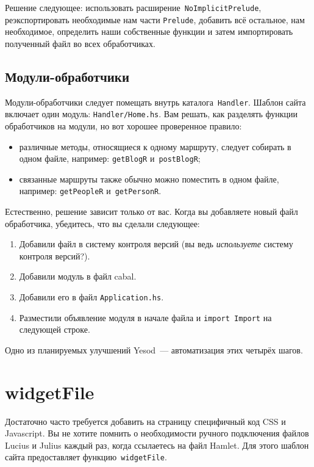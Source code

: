 Решение следующее: использовать расширение~\lstinline!NoImplicitPrelude!,
реэкспортировать необходимые нам части \lstinline!Prelude!, добавить всё
остальное, нам необходимое, определить наши собственные функции и затем
импортировать полученный файл во всех обработчиках.

\subsection{Модули-обработчики}
Модули-обработчики следует помещать внутрь каталога~\lstinline!Handler!. Шаблон
сайта включает один модуль: \texttt{Handler/Home.hs}. Вам решать, как разделять
функции обработчиков на модули, но вот хорошее проверенное правило:
\begin{itemize}
  \item различные методы, относящиеся к одному маршруту, следует собирать в
      одном файле, например: \lstinline!getBlogR! и~\lstinline!postBlogR!;
  \item связанные маршруты также обычно можно поместить в одном файле, например:
      \lstinline!getPeopleR! и~\lstinline!getPersonR!.
\end{itemize}

Естественно, решение зависит только от вас. Когда вы добавляете новый файл
обработчика, убедитесь, что вы сделали следующее:
\begin{enumerate}
  \item Добавили файл в систему контроля версий (вы ведь \emph{используете}
      систему контроля версий?).
  \item Добавили модуль в файл cabal.
  \item Добавили его в файл \texttt{Application.hs}.
  \item Разместили объявление модуля в начале файла и \lstinline!import Import!
      на следующей строке.
\end{enumerate}

\begin{remark}
  Одно из планируемых улучшений Yesod~--- автоматизация этих четырёх шагов.
\end{remark}

\section{widgetFile}
Достаточно часто требуется добавить на страницу специфичный код CSS и
Javascript.  Вы не хотите помнить о необходимости ручного подключения файлов
Lucius и Julius каждый раз, когда ссылаетесь на файл Hamlet. Для этого шаблон
сайта предоставляет функцию~\lstinline!widgetFile!.

